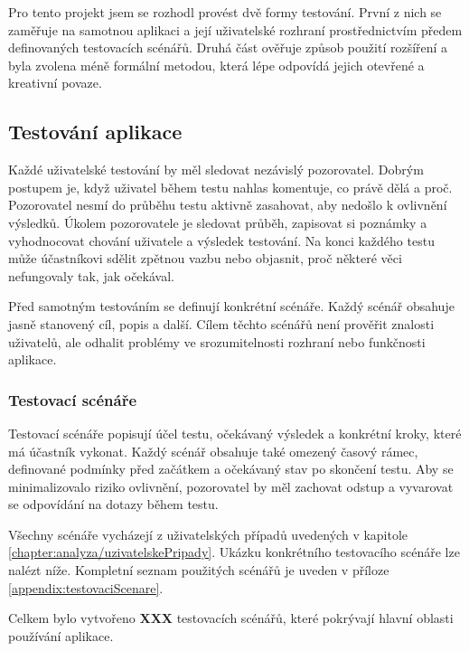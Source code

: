 Pro tento projekt jsem se rozhodl provést dvě formy testování.
První z nich se zaměřuje na samotnou aplikaci a její uživatelské rozhraní prostřednictvím předem definovaných testovacích scénářů. 
Druhá část ověřuje způsob použití rozšíření a byla zvolena méně formální metodou, která lépe odpovídá jejich otevřené a kreativní povaze.

\subsection{Testování aplikace}

Každé uživatelské testování by měl sledovat nezávislý pozorovatel. 
Dobrým postupem je, když uživatel během testu nahlas komentuje, co právě dělá a proč. 
Pozorovatel nesmí do průběhu testu aktivně zasahovat, aby nedošlo k ovlivnění výsledků. 
Úkolem pozorovatele je sledovat průběh, zapisovat si poznámky a vyhodnocovat chování uživatele a výsledek testování. 
Na konci každého testu může účastníkovi sdělit zpětnou vazbu nebo objasnit, proč některé věci nefungovaly tak, jak očekával.

Před samotným testováním se definují konkrétní scénáře.
Každý scénář obsahuje jasně stanovený cíl, popis a další. 
Cílem těchto scénářů není prověřit znalosti uživatelů, ale odhalit problémy ve srozumitelnosti rozhraní nebo funkčnosti aplikace.

\subsubsection{Testovací scénáře}

Testovací scénáře popisují účel testu, očekávaný výsledek a konkrétní kroky, které má účastník vykonat.
Každý scénář obsahuje také omezený časový rámec, definované podmínky před začátkem a očekávaný stav po skončení testu. 
Aby se minimalizovalo riziko ovlivnění, pozorovatel by měl zachovat odstup a vyvarovat se odpovídání na dotazy během testu.

Všechny scénáře vycházejí z uživatelských případů uvedených v kapitole \ref{chapter:analyza/uzivatelskePripady}.
Ukázku konkrétního testovacího scénáře lze nalézt níže. 
Kompletní seznam použitých scénářů je uveden v příloze \ref{appendix:testovaciScenare}.

Celkem bylo vytvořeno \textbf{XXX} testovacích scénářů, které pokrývají hlavní oblasti používání aplikace.



